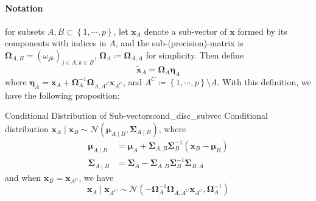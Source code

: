 \documentclass[twoside]{article}
\begin{document}
\paragraph*{Notation} for subsets $A,B\subset \left\{ 1,\cdots,p \right\}$, let $\mathbf{x}_A$ denote a sub-vector of $\mathbf{x}$ formed by its components with indices in $A$, and the sub-(precision)-matrix is $\boldsymbol{\Omega}_{A,B}=\left(\omega_{jk}\right)_{j\in A,k\in B}$, $\boldsymbol{\Omega}_A\coloneq \boldsymbol{\Omega}_{A,A}$ for simplicity.
Then define $$\tilde{\mathbf{x}}_A = \boldsymbol{\Omega}_A\boldsymbol{\eta}_A$$
where $\boldsymbol{\eta}_A = \mathbf{x}_A+ \boldsymbol{\Omega}_A^{-1}\boldsymbol{\Omega}_{A,A^C}\mathbf{x}_{A^C}$, and $A^C\coloneq \left\{1,\cdots,p\right\}\setminus A$. With this definition, we have the following proposition:

\begin{proposition}{Conditional Distribution of Sub-vectors}{cond_disc_subvec}
    Conditional distribution $\mathbf{x}_A\mid \mathbf{x}_B \sim \mathcal{N}\left(\boldsymbol{\mu}_{A\mid B},\boldsymbol{\Sigma}_{A\mid B}\right)$, where 
    \begin{align*}
        \boldsymbol{\mu}_{A\mid B} &= \boldsymbol{\mu}_A + \boldsymbol{\Sigma}_{A,B}\boldsymbol{\Sigma}_B^{-1}\left(\mathbf{x}_B-\boldsymbol{\mu}_{B}\right) \\
        \boldsymbol{\Sigma}_{A\mid B} &= \boldsymbol{\Sigma}_A-\boldsymbol{\Sigma}_{A,B}\boldsymbol{\Sigma}_B^{-1}\boldsymbol{\Sigma}_{B,A}
    \end{align*}
    and when $\mathbf{x}_B=\mathbf{x}_{A^C}$, we have
    $$
    \mathbf{x}_A\mid \mathbf{x}_{A^C} \sim \mathcal{N}\left( -\boldsymbol{\Omega}_A^{-1}\boldsymbol{\Omega}_{A,A^C}\mathbf{x}_{A^C},\boldsymbol{\Omega}_A^{-1} \right)
    $$
\end{proposition}

\newpage


\end{document}
